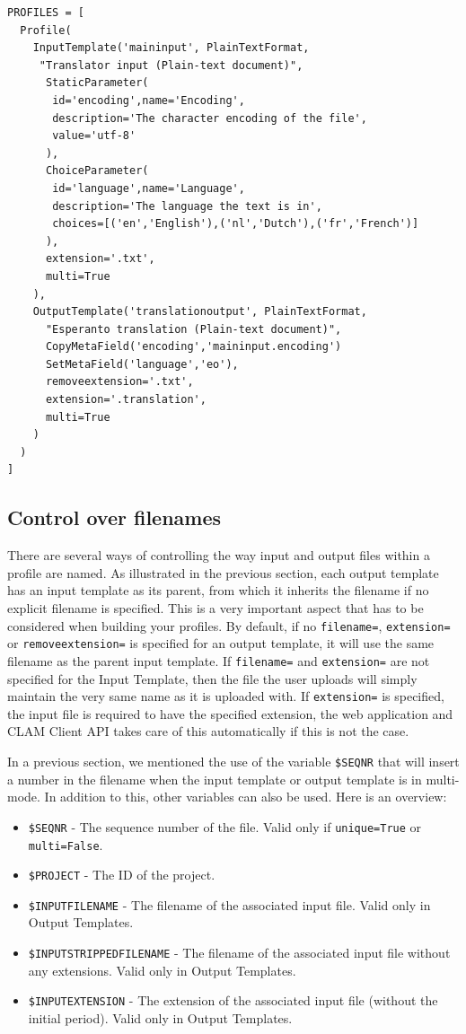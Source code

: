 \documentclass[a4paper,12pt,twoside,openright]{report}
\begin{document}
{\small
\begin{verbatim}
PROFILES = [ 
  Profile( 
    InputTemplate('maininput', PlainTextFormat,
     "Translator input (Plain-text document)",  
      StaticParameter(
       id='encoding',name='Encoding',
       description='The character encoding of the file', 
       value='utf-8'
      ),  
      ChoiceParameter(
       id='language',name='Language',
       description='The language the text is in', 
       choices=[('en','English'),('nl','Dutch'),('fr','French')]
      ),
      extension='.txt',
      multi=True
    ), 
    OutputTemplate('translationoutput', PlainTextFormat,
      "Esperanto translation (Plain-text document)",  
      CopyMetaField('encoding','maininput.encoding')
      SetMetaField('language','eo'),
      removeextension='.txt',
      extension='.translation',
      multi=True
    )    
  )
]
\end{verbatim}
}


\subsection{Control over filenames}
\label{sec:filenamevariables}

There are several ways of controlling the way input and output files within a
profile are named. As illustrated in the previous section, each output template
has an input template as its parent, from which it inherits the filename if no
explicit filename is specified. This is a very important aspect that has to be
considered when building your profiles. By default, if no \texttt{filename=}, \texttt{extension=} or
\texttt{removeextension=} is specified for an output template, it will use the
same filename as the parent input template. If \texttt{filename=} and
\texttt{extension=} are not specified for the Input Template, then the file the
user uploads will simply maintain the very same name as it is uploaded with. If
\texttt{extension=} is specified, the input file is required to have the
specified extension, the web application and CLAM Client API takes care of this
automatically if this is not the case.

In a previous section, we mentioned the use of the variable \texttt{\$SEQNR}
that will insert a number in the filename when the input template or output template is in
multi-mode. In addition to this, other variables can also be used. Here is an
overview:

\begin{itemize}
\item \texttt{\$SEQNR} - The sequence number of the file. Valid only if \texttt{unique=True} or \texttt{multi=False}.
\item \texttt{\$PROJECT} - The ID of the project.
\item \texttt{\$INPUTFILENAME} - The filename of the associated input file. Valid only in Output Templates.
\item \texttt{\$INPUTSTRIPPEDFILENAME} - The filename of the associated input file without any extensions. Valid only in Output Templates.
\item \texttt{\$INPUTEXTENSION} - The extension of the associated input file (without the initial period). Valid only in Output Templates.
\end{itemize} 
\end{document}
